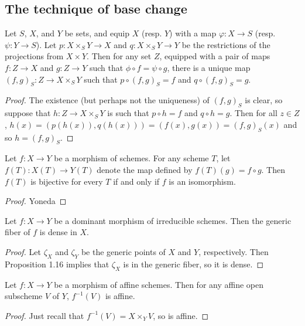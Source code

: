 \subsection{The technique of base change}

\begin{exer}
	Let $S$, $X$, and $Y$ be sets, and equip $X$ (resp. $Y$) with a map
	$\varphi: X \to S$ (resp. $\psi\colon Y \to S$). Let
	$p: X \times_S Y \to X$ and $q: X \times_S Y \to Y$ be the
	restrictions of the projections from $X \times Y$. Then for any set $Z$,
	equipped with a pair of maps $f: Z \to X$ and $g: Z \to Y$
	such that $\phi \circ f = \psi \circ g$, there is a unique map
	$(f,g)_S: Z \to X \times_S Y$ such that $p \circ (f,g)_S = f$ and
	$q \circ (f,g)_S = g$.
\end{exer}
\begin{proof}
	The existence (but perhaps not the uniqueness) of $(f,g)_S$ is clear, so
	suppose that $h: Z \to X \times_S Y$ is such that $p \circ h = f$
	and $q \circ h = g$. Then for all $z \in Z$, $h(x) = (p(h(x)),q(h(x)))
	= (f(x),g(x)) = (f,g)_S(x)$ and so $h = (f,g)_S$.
\end{proof}

\begin{exer}
	Let $f: X \to Y$ be a morphism of schemes. For any scheme $T$, let
	$f(T): X(T) \to Y(T)$ denote the map defined by $f(T)(g) =
	f \circ g$. Then $f(T)$ is bijective for every $T$ if and only if
	$f$ is an isomorphism.
\end{exer}
\begin{proof}
	Yoneda
\end{proof}

\begin{exer}
	Let $f: X \to Y$ be a dominant morphism of irreducible schemes. Then
	the generic fiber of $f$ is dense in $X$.
\end{exer}
\begin{proof}
	Let $\zeta_X$ and $\zeta_Y$ be the generic points of $X$ and $Y$,
	respectively. Then Proposition 1.16 implies that $\zeta_X$ is in the
	generic fiber, so it is dense.
\end{proof}

\begin{exer}
	Let $f: X \to Y$ be a morphism of affine schemes. Then for any affine
	open subscheme $V$ of $Y$, $f^{-1}(V)$ is affine.
\end{exer}
\begin{proof}
	Just recall that $f^{-1}(V) = X \times_Y V$, so is affine.
\end{proof}

